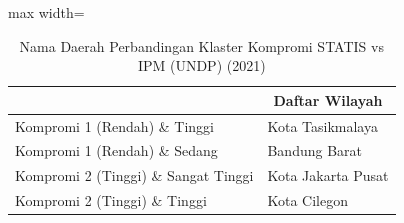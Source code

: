 \begin{table}[H]
\centering
\caption{Nama Daerah Perbandingan Klaster Kompromi STATIS vs IPM (UNDP) (2021)} \label{tab:sample2comp_ipm_name_2021}
\begin{adjustbox}{max width=\textwidth}
\begin{tabular}{|>{\centering\arraybackslash}p{4cm}|p{10cm}|}
\hline
\multicolumn{1}{|c|}{\textbf{Kategori}} & \multicolumn{1}{c|}{\textbf{Daftar Wilayah}} \\
\hline
Kompromi 1 (Rendah) \& Tinggi & Kota Tasikmalaya \\
\hline
Kompromi 1 (Rendah) \& Sedang & Bandung Barat \\
\hline
Kompromi 2 (Tinggi) \& Sangat Tinggi & Kota Jakarta Pusat \\
\hline
Kompromi 2 (Tinggi) \& Tinggi & Kota Cilegon \\
\hline
\end{tabular}
\end{adjustbox}
\end{table}